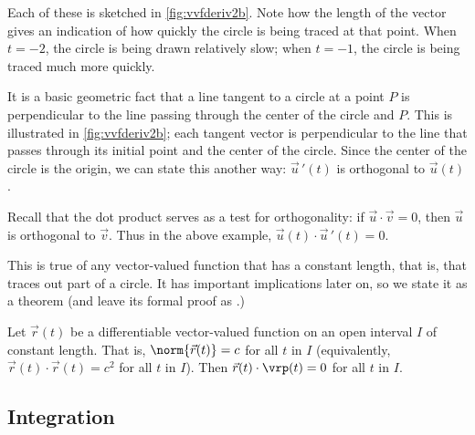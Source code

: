 \begin{example}
\begin{enumerate}
{}%
%
Each of these is sketched in \autoref{fig:vvfderiv2b}. Note how the length of the vector gives an indication of how quickly the circle is being traced at that point. When $t=-2$, the circle is being drawn relatively slow; when $t=-1$, the circle is being traced much more quickly.
\end{enumerate}
\end{example}

It is a basic geometric fact that a line tangent to a circle at a point $P$ is perpendicular to the line passing through the center of the circle and $P$. This is illustrated in \autoref{fig:vvfderiv2b}; each tangent vector is perpendicular to the line that passes through its initial point and the center of the circle. Since the center of the circle is the origin, we can state this another way: $\vec u\,'(t)$ is orthogonal to $\vec u(t)$.

Recall that the dot product serves as a test for orthogonality: if $\vec u\cdot \vec v = 0$, then $\vec u$ is orthogonal to $\vec v$. Thus in the above example, $\vec u(t)\cdot \vec u\,'(t)=0$.

This is true of any vector-valued function that has a constant length, that is, that traces out part of a circle. It has important implications later on, so we state it as a theorem (and leave its formal proof as .)

\begin{theorem}\label{thm:vects_of_constant_length}
Let $\vec r(t)$ be a differentiable vector-valued function on an open interval $I$ of constant length. That is, $\norm{\vec r(t)} = c$ for all $t$ in $I$ (equivalently, $\vec r(t)\cdot \vec r(t) = c^2$ for all $t$ in $I$). 
Then $\vec r(t)\cdot\vrp(t) = 0$ for all $t$ in $I$.
\end{theorem}

\subsection{Integration}

